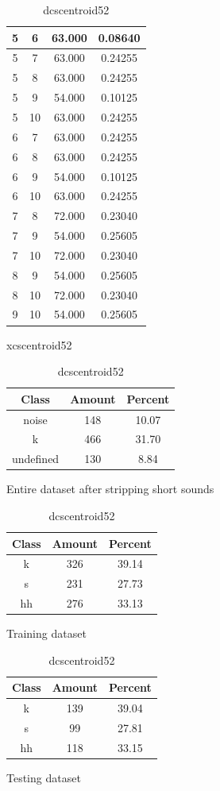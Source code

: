 \begin{table}
\begin{subtable}[h]{0.45\textwidth}
{\begin{tabular}{|c|c|c|c|}
 5 & 6 & 63.000 & 0.08640\\ \hline 
 5 & 7 & 63.000 & 0.24255\\ \hline 
 5 & 8 & 63.000 & 0.24255\\ \hline 
 5 & 9 & 54.000 & 0.10125\\ \hline 
 5 & 10 & 63.000 & 0.24255\\ \hline 
 6 & 7 & 63.000 & 0.24255\\ \hline 
 6 & 8 & 63.000 & 0.24255\\ \hline 
 6 & 9 & 54.000 & 0.10125\\ \hline 
 6 & 10 & 63.000 & 0.24255\\ \hline 
 7 & 8 & 72.000 & 0.23040\\ \hline 
 7 & 9 & 54.000 & 0.25605\\ \hline 
 7 & 10 & 72.000 & 0.23040\\ \hline 
 8 & 9 & 54.000 & 0.25605\\ \hline 
 8 & 10 & 72.000 & 0.23040\\ \hline 
 9 & 10 & 54.000 & 0.25605\\ \hline 

\end{tabular}
}\label{xlscentroid52}
\caption{xcscentroid52}
\end{subtable}

\begin{subtable}[h]{0.45\textwidth}
\centering
\begin{tabular}{|c|c|c|}
\hline
Class & Amount & Percent\\ \hline
noise & 148 & 10.07\\ \hline
k & 466 & 31.70\\ \hline
undefined & 130 & 8.84\\ \hline
\end{tabular}
\caption{Entire dataset after stripping short sounds}
\end{subtable}
\hfill
\begin{subtable}[h]{0.45\textwidth}
\centering
\begin{tabular}{|c|c|c|}
\hline
Class & Amount & Percent\\ \hline
k & 326 & 39.14\\ \hline
s & 231 & 27.73\\ \hline
hh & 276 & 33.13\\ \hline
\end{tabular}
\caption{Training dataset}
\end{subtable}
\hfill
\begin{subtable}[h]{0.45\textwidth}
\centering
\begin{tabular}{|c|c|c|}
\hline
Class & Amount & Percent\\ \hline
k & 139 & 39.04\\ \hline
s & 99 & 27.81\\ \hline
hh & 118 & 33.15\\ \hline
\end{tabular}
\caption{Testing dataset}
\end{subtable}
\hfill

\label{dlscentroid52}

\caption{dcscentroid52}

\end{table}\clearpage
